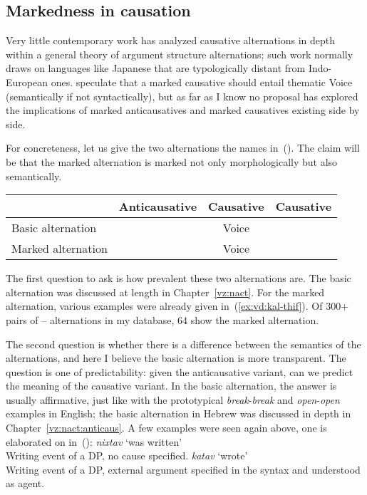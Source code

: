 		\subsection{Markedness in causation}
Very little contemporary work has analyzed causative alternations in depth within a general theory of argument structure alternations; such work normally draws on languages like Japanese \citep{jacobsen92} that are typologically distant from Indo-European ones. \citet[62ff]{layering15} speculate that a marked causative should entail thematic Voice (semantically if not syntactically), but as far as I know no proposal has explored the implications of marked anticausatives and marked causatives existing side by side.

For concreteness, let us give the two alternations the names in~(\nextx). The claim will be that the marked alternation is marked not only morphologically but also semantically.
\ex
\begin{tabular}{l|ccc}
	&	Anticausative & Causative & Causative\\\hline
Basic alternation	& {\vz} & Voice &   \\
Marked alternation		&		&  Voice & {\vd}\\
\end{tabular}
\xe

The first question to ask is how prevalent these two alternations are. The basic alternation was discussed at length in Chapter~\ref{vz:nact}. For the marked alternation, various examples were already given in~(\ref{ex:vd:kal-thif}). Of 300+ pairs of {\tkal}--{\thif} alternations in my database, 64 show the marked alternation.%

%
%

The second question is whether there is a difference between the semantics of the alternations, and here I believe the basic alternation is more transparent. The question is one of predictability: given the anticausative variant, can we predict the meaning of the causative variant. In the basic alternation, the answer is usually affirmative, just like with the prototypical \emph{break}-\emph{break} and \emph{open}-\emph{open} examples in English; the basic alternation in Hebrew was discussed in depth in Chapter~\ref{vz:nact:anticaus}. A few examples were seen again above, one is elaborated on in~(\nextx):
\pex
	\a \emph{nixtav} `was written'\\
		Writing event of a DP, no cause specified.
	\a \emph{katav} `wrote'\\
		Writing event of a DP, external argument specified in the syntax and understood as agent.
\xe


